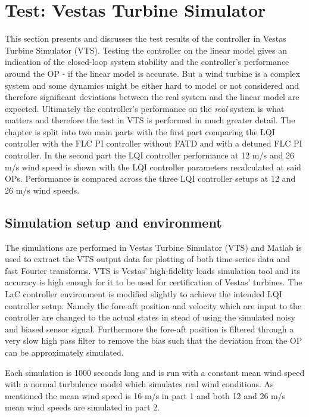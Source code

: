 \section{Test: Vestas Turbine Simulator} \label{sec:test_vts}
This section presents and discusses the test results of the controller in Vestas Turbine Simulator (VTS). Testing the controller on the linear model gives an indication of the closed-loop system stability and the controller's performance around the OP - if the linear model is accurate. But a wind turbine is a complex system and some dynamics might be either hard to model or not considered and therefore significant deviations between the real system and the linear model are expected. Ultimately the controller's performance on the \textit{real} system is what matters and therefore the test in VTS is performed in much greater detail. The chapter is split into two main parts with the first part comparing the LQI controller with the FLC PI controller without FATD and with a detuned FLC PI controller. In the second part the LQI controller performance at 12 m/s and 26 m/s wind speed is shown with the LQI controller parameters recalculated at said OPs. Performance is compared across the three LQI controller setups at 12 and 26 m/s wind speeds.

\subsection{Simulation setup and environment}
The simulations are performed in Vestas Turbine Simulator (VTS) and Matlab is used to extract the VTS output data for plotting of both time-series data and fast Fourier transforms. VTS is Vestas' high-fidelity loads simulation tool and its accuracy is high enough for it to be used for certification of Vestas' turbines.  The LaC controller environment is modified slightly to achieve the intended LQI controller setup. Namely the fore-aft position and velocity which are input to the controller are changed to the actual states in stead of using the simulated noisy and biased sensor signal. Furthermore the fore-aft position is filtered through a very slow high pass filter to remove the bias such that the deviation from the OP can be approximately simulated.

\smallskip
Each simulation is 1000 seconds long and is run with a constant mean wind speed with a normal turbulence model which simulates real wind conditions. As mentioned the mean wind speed is 16 m/s in part 1 and both 12 and 26 m/s mean wind speeds are simulated in part 2.

